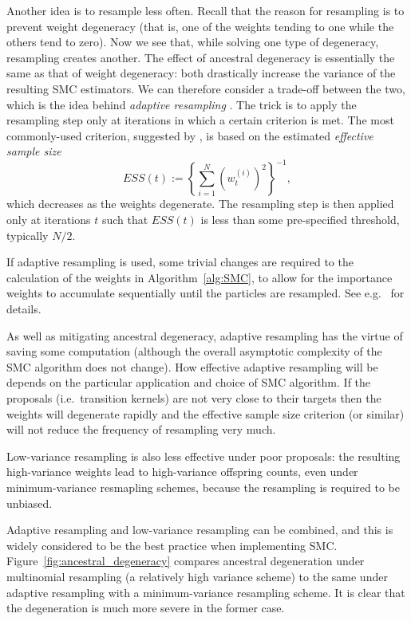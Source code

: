 Another idea is to resample less often. Recall that the reason for resampling is to prevent weight degeneracy (that is, one of the weights tending to one while the others tend to zero). Now we see that, while solving one type of degeneracy, resampling creates another. The effect of ancestral degeneracy is essentially the same as that of weight degeneracy: both drastically increase the variance of the resulting SMC estimators. 
We can therefore consider a trade-off between the two, which is the idea behind \emph{adaptive resampling} \parencite[Section 4]{liu1995}.
The trick is to apply the resampling step only at iterations in which a certain criterion is met. The most commonly-used criterion, suggested by \textcite[Equation (14)]{liu1995}, is based on the estimated \emph{effective sample size}
\begin{equation*}
ESS(t) := \left\{ \sum_{i=1}^N (w_t^{(i)})^2 \right\}^{-1} ,
\end{equation*}
which decreases as the weights degenerate.
The resampling step is then applied only at iterations $t$ such that $ESS(t)$ is less than some pre-specified threshold, typically $N/2$\seb{[citation?]}.

If adaptive resampling is used, some trivial changes are required to the calculation of the weights in Algorithm~\ref{alg:SMC}, to allow for the importance weights to accumulate sequentially until the particles are resampled. See e.g.\ \textcite[Section 10.2]{chopin2020} for details.

As well as mitigating ancestral degeneracy, adaptive resampling has the virtue of saving some computation (although the overall asymptotic complexity of the SMC algorithm does not change).
How effective adaptive resampling will be depends on the particular application and choice of SMC algorithm. If the proposals (i.e.\ transition kernels) are not very close to their targets then the weights will degenerate rapidly and the effective sample size criterion (or similar) will not reduce the frequency of resampling very much.

Low-variance resampling is also less effective under poor proposals: the resulting high-variance weights lead to high-variance offspring counts, even under minimum-variance resmapling schemes, because the resampling is required to be unbiased.

Adaptive resampling and low-variance resampling can be combined, and this is widely considered to be the best practice when implementing SMC.
Figure~\ref{fig:ancestral_degeneracy} compares ancestral degeneration under multinomial resampling (a relatively high variance scheme) to the same under adaptive resampling with a minimum-variance resampling scheme.
It is clear that the degeneration is much more severe in the former case.

